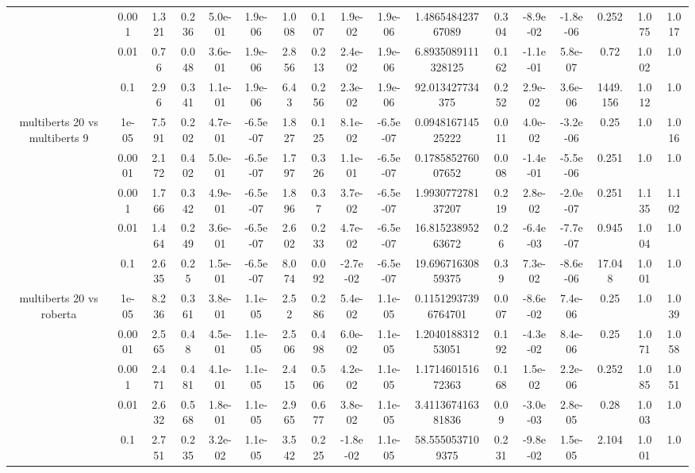 \begin{tabular}{|c|c|c|c|c|c|c|c|c|c|c|c|c|c|c|c|c|}
 & 0.001 & 1.321 & 0.236 & 5.0e-01 & 1.9e-06 & 1.008 & 0.107 & 1.9e-02 & 1.9e-06 & 1.486548423767089 & 0.304 & -8.9e-02 & -1.8e-06 & 0.252 & 1.075 & 1.017 \\
 & 0.01 & 0.76 & 0.048 & 3.6e-01 & 1.9e-06 & 2.856 & 0.213 & 2.4e-02 & 1.9e-06 & 6.8935089111328125 & 0.162 & -1.1e-01 & 5.8e-07 & 0.72 & 1.002 & 1.0 \\
 & 0.1 & 2.96 & 0.341 & 1.1e-01 & 1.9e-06 & 6.43 & 0.256 & 2.3e-02 & 1.9e-06 & 92.013427734375 & 0.252 & 2.9e-02 & 3.6e-06 & 1449.156 & 1.012 & 1.0 \\
\hline
\multirow{5}{*}{multiberts 20 vs multiberts 9} & 1e-05 & 7.591 & 0.202 & 4.7e-01 & -6.5e-07 & 1.827 & 0.125 & 8.1e-02 & -6.5e-07 & 0.094816714525222 & 0.011 & 4.0e-02 & -3.2e-06 & 0.25 & 1.0 & 1.016 \\
 & 0.0001 & 2.172 & 0.402 & 5.0e-01 & -6.5e-07 & 1.797 & 0.326 & 1.1e-01 & -6.5e-07 & 0.178585276007652 & 0.008 & -1.4e-01 & -5.5e-06 & 0.251 & 1.0 & 1.0 \\
 & 0.001 & 1.766 & 0.342 & 4.9e-01 & -6.5e-07 & 1.896 & 0.37 & 3.7e-02 & -6.5e-07 & 1.993077278137207 & 0.219 & 2.8e-02 & -2.0e-07 & 0.251 & 1.135 & 1.102 \\
 & 0.01 & 1.464 & 0.249 & 3.6e-01 & -6.5e-07 & 2.602 & 0.233 & 4.7e-02 & -6.5e-07 & 16.81523895263672 & 0.26 & -6.4e-03 & -7.7e-07 & 0.945 & 1.004 & 1.0 \\
 & 0.1 & 2.635 & 0.25 & 1.5e-01 & -6.5e-07 & 8.074 & 0.092 & -2.7e-02 & -6.5e-07 & 19.69671630859375 & 0.39 & 7.3e-02 & -8.6e-06 & 17.048 & 1.001 & 1.0 \\
\hline
\multirow{5}{*}{multiberts 20 vs roberta } & 1e-05 & 8.236 & 0.361 & 3.8e-01 & 1.1e-05 & 2.52 & 0.286 & 5.4e-02 & 1.1e-05 & 0.11512937396764701 & 0.007 & -8.6e-02 & 7.4e-06 & 0.25 & 1.0 & 1.039 \\
 & 0.0001 & 2.565 & 0.48 & 4.5e-01 & 1.1e-05 & 2.506 & 0.498 & 6.0e-02 & 1.1e-05 & 1.204018831253051 & 0.192 & -4.3e-02 & 8.4e-06 & 0.25 & 1.071 & 1.058 \\
 & 0.001 & 2.471 & 0.481 & 4.1e-01 & 1.1e-05 & 2.415 & 0.506 & 4.2e-02 & 1.1e-05 & 1.171460151672363 & 0.168 & 1.5e-02 & 2.2e-06 & 0.252 & 1.085 & 1.051 \\
 & 0.01 & 2.632 & 0.568 & 1.8e-01 & 1.1e-05 & 2.965 & 0.677 & 3.8e-02 & 1.1e-05 & 3.411367416381836 & 0.09 & -3.0e-03 & 2.8e-05 & 0.28 & 1.003 & 1.0 \\
 & 0.1 & 2.751 & 0.235 & 3.2e-02 & 1.1e-05 & 3.542 & 0.225 & -1.8e-02 & 1.1e-05 & 58.5550537109375 & 0.231 & -9.8e-02 & 1.5e-05 & 2.104 & 1.001 & 1.0 \\

\end{tabular}
